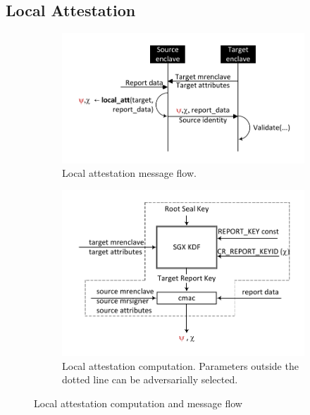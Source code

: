 \documentclass[letterpaper]{article}
\begin{document}
  \subsection{Local Attestation}
  \label{ssec:localatt}

  \begin{figure}
    \centering
    \begin{subfigure}[h]{.5\textwidth}
      \centering
      \includegraphics[width=.95\linewidth]{Diagrams/LocalAttestationFlow}
      \caption{Local attestation message flow.}
      \label{fig:localattestationflow}
    \end{subfigure}%
    \begin{subfigure}[h]{.5\textwidth}
      \centering
      \includegraphics[width=.85\linewidth]{Diagrams/LocalAttestation}
      \caption{Local attestation computation. Parameters outside the
        dotted line can be adversarially selected.}
      \label{fig:localattestation}
    \end{subfigure}%
    \caption{Local attestation computation and message flow}
    \label{fig:localatt}
  \end{figure}
\end{document}

